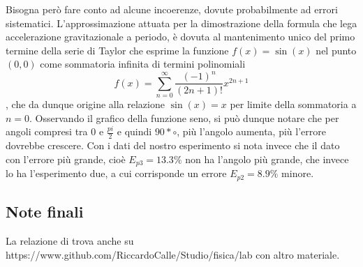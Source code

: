 \documentclass{article}
\begin{document}
Bisogna però fare conto ad alcune incoerenze, dovute probabilmente ad errori sistematici. L'approssimazione attuata per la dimostrazione della formula che lega accelerazione gravitazionale a periodo, è dovuta al mantenimento unico del primo termine della serie di Taylor che esprime la funzione $f(x) = \sin(x)$ nel punto $(0, 0)$ come sommatoria infinita di termini polinomiali $$f(x) = \sum_{n=0}^{\infty} \frac{(-1)^n}{(2n+1)!} x^{2n+1}$$, che da dunque origine alla relazione $\sin(x) = x$ per limite della sommatoria a $n = 0$. Osservando il grafico della funzione seno, si può dunque notare che per angoli compresi tra $0$ e $\frac{pi}{2}$ e quindi $90*\circ$, più l'angolo aumenta, più l'errore dovrebbe crescere. Con i dati del nostro esperimento si nota invece che il dato con l'errore più grande, cioè $E_{p3} = 13.3\%$ non ha l'angolo più grande, che invece lo ha l'esperimento due, a cui corrisponde un errore $E_{p2} = 8.9\%$ minore.\\

\subsection{Note finali}
La relazione di trova anche su https://www.github.com/RiccardoCalle/Studio/fisica/lab con altro materiale.
\end{document}
